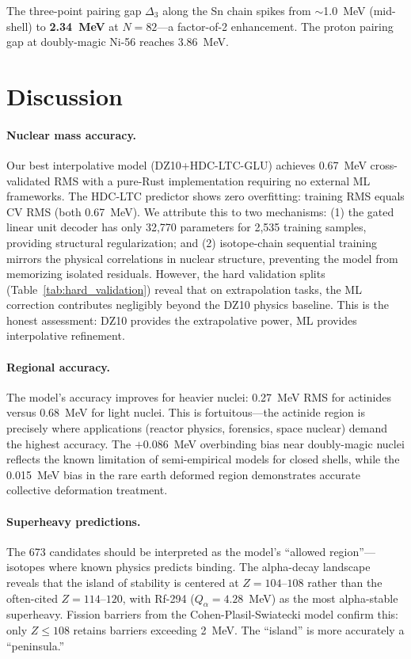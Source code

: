 \documentclass[letterpaper,11pt]{article}
\begin{document}
The three-point pairing gap $\Delta_3$ along the Sn chain spikes from
$\sim$1.0~MeV (mid-shell) to \textbf{2.34~MeV} at $N = 82$---a factor-of-2
enhancement. The proton pairing gap at doubly-magic Ni-56 reaches 3.86~MeV.

\section{Discussion}

\paragraph{Nuclear mass accuracy.} Our best interpolative model (DZ10+HDC-LTC-GLU)
achieves 0.67~MeV cross-validated RMS with a pure-Rust implementation requiring
no external ML frameworks. The HDC-LTC predictor shows zero overfitting: training
RMS equals CV RMS (both 0.67~MeV). We attribute this to two mechanisms: (1) the
gated linear unit decoder has only 32,770 parameters for 2,535 training samples,
providing structural regularization; and (2) isotope-chain sequential training
mirrors the physical correlations in nuclear structure, preventing the model from
memorizing isolated residuals. However, the hard validation splits
(Table~\ref{tab:hard_validation}) reveal that on extrapolation tasks, the ML
correction contributes negligibly beyond the DZ10 physics baseline. This is the
honest assessment: DZ10 provides the extrapolative power, ML provides
interpolative refinement.

\paragraph{Regional accuracy.} The model's accuracy improves for heavier nuclei:
0.27~MeV RMS for actinides versus 0.68~MeV for light nuclei. This is
fortuitous---the actinide region is precisely where applications (reactor
physics, forensics, space nuclear) demand the highest accuracy. The $+0.086$~MeV
overbinding bias near doubly-magic nuclei reflects the known limitation of
semi-empirical models for closed shells, while the 0.015~MeV bias in the rare
earth deformed region demonstrates accurate collective deformation treatment.

\paragraph{Superheavy predictions.} The 673 candidates should be interpreted as
the model's ``allowed region''---isotopes where known physics predicts binding.
The alpha-decay landscape reveals that the island of stability is centered at
$Z = 104$--$108$ rather than the often-cited $Z = 114$--$120$, with Rf-294
($Q_\alpha = 4.28$~MeV) as the most alpha-stable superheavy. Fission barriers
from the Cohen-Plasil-Swiatecki model confirm this: only $Z \leq 108$ retains
barriers exceeding 2~MeV. The ``island'' is more accurately a ``peninsula.''
\end{document}
